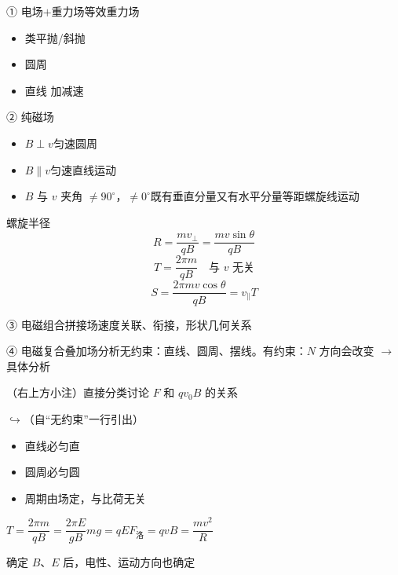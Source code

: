 ① 电场$+$重力场\quad 等效重力场
\begin{itemize}
\item 类平抛/斜抛
\item 圆周
\item 直线 加减速
\end{itemize}

② 纯磁场
\begin{itemize}
\item $B\perp v$\quad 匀速圆周
\item $B\parallel v$\quad 匀速直线运动
\item $B$ 与 $v$ 夹角 $\ne 90^\circ$，$\ne 0^\circ$\quad 既有垂直分量又有水平分量\quad 等距螺旋线运动
\end{itemize}
螺旋半径
\[
R=\frac{mv_{\perp}}{qB}=\frac{mv\sin\theta}{qB}
\]
\[
T=\frac{2\pi m}{qB}\quad\text{与 $v$ 无关}
\]
\[
S=\frac{2\pi mv\cos\theta}{qB}=v_{\parallel}T
\]

③ 电磁组合拼接场\quad 速度关联、衔接，形状几何关系

④ 电磁复合叠加场\quad 分析\quad 无约束：直线、圆周、摆线。有约束：$N$ 方向会改变 $\to$ 具体分析

（右上方小注）直接分类讨论 $F$ 和 $qv_0B$ 的关系
\par\smallskip
$\hookrightarrow$（自“无约束”一行引出）
\begin{itemize}
\item 直线必匀直
\item 圆周必匀圆
\item 周期由场定，与比荷无关
\end{itemize}
$T=\dfrac{2\pi m}{qB}=\dfrac{2\pi E}{gB}$\qquad $mg=qE$\qquad $F_{\text{洛}}=qvB=\dfrac{mv^2}{R}$

确定 $B$、$E$ 后，电性、运动方向也确定

